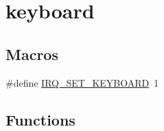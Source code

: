 \hypertarget{group__keyboard}{}\section{keyboard}
\label{group__keyboard}
\subsection*{Macros}
\begin{DoxyCompactItemize}
\item 
\#define \mbox{\hyperlink{group__keyboard_ga09e63afbc5d0ab2780bd560fba326d58}{I\+R\+Q\+\_\+\+S\+E\+T\+\_\+\+K\+E\+Y\+B\+O\+A\+RD}}~1
\end{DoxyCompactItemize}
\subsection*{Functions}
